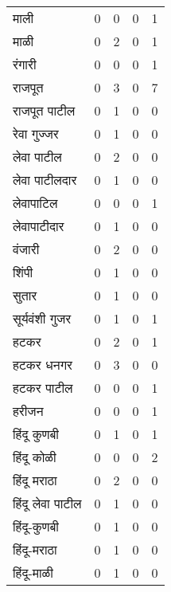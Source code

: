 \documentclass{article}
\begin{document}
\begin{table}
\begin{tabular}{lrrrr}
माली & 0 & 0 & 0 & 1 \\
माळी & 0 & 2 & 0 & 1 \\
रंगारी & 0 & 0 & 0 & 1 \\
राजपूत & 0 & 3 & 0 & 7 \\
राजपूत पाटील & 0 & 1 & 0 & 0 \\
रेवा गुज्जर & 0 & 1 & 0 & 0 \\
लेवा पाटील & 0 & 2 & 0 & 0 \\
लेवा पाटीलदार & 0 & 1 & 0 & 0 \\
लेवापाटिल & 0 & 0 & 0 & 1 \\
लेवापाटीदार & 0 & 1 & 0 & 0 \\
वंजारी & 0 & 2 & 0 & 0 \\
शिंपी & 0 & 1 & 0 & 0 \\
सुतार & 0 & 1 & 0 & 0 \\
सूर्यवंशी गुजर & 0 & 1 & 0 & 1 \\
हटकर & 0 & 2 & 0 & 1 \\
हटकर धनगर & 0 & 3 & 0 & 0 \\
हटकर पाटील & 0 & 0 & 0 & 1 \\
हरीजन & 0 & 0 & 0 & 1 \\
हिंदू कुणबी & 0 & 1 & 0 & 1 \\
हिंदू कोळी & 0 & 0 & 0 & 2 \\
हिंदू मराठा & 0 & 2 & 0 & 0 \\
हिंदू लेवा पाटील & 0 & 1 & 0 & 0 \\
हिंदू-कुणबी & 0 & 1 & 0 & 0 \\
हिंदू-मराठा & 0 & 1 & 0 & 0 \\
हिंदू-माळी & 0 & 1 & 0 & 0 \\
\bottomrule
\end{tabular}
\end{table}
\end{document}
